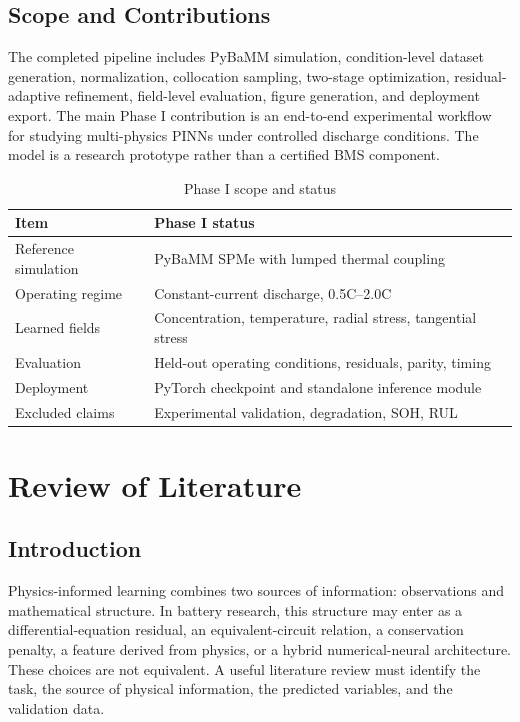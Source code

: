 \documentclass[14pt,a4paper,oneside]{extreport}
\begin{document}
\section{Scope and Contributions}
\label{sec:intro-last}
The completed pipeline includes PyBaMM simulation, condition-level dataset generation, normalization, collocation sampling, two-stage optimization, residual-adaptive refinement, field-level evaluation, figure generation, and deployment export. The main Phase I contribution is an end-to-end experimental workflow for studying multi-physics PINNs under controlled discharge conditions. The model is a research prototype rather than a certified BMS component.

\begin{table}[htbp]
\centering
\caption{Phase I scope and status}
\small
\begin{tabularx}{\textwidth}{p{}X}
\toprule
Item & Phase I status\\
\midrule
Reference simulation & PyBaMM SPMe with lumped thermal coupling\\
Operating regime & Constant-current discharge, 0.5C--2.0C\\
Learned fields & Concentration, temperature, radial stress, tangential stress\\
Evaluation & Held-out operating conditions, residuals, parity, timing\\
Deployment & PyTorch checkpoint and standalone inference module\\
Excluded claims & Experimental validation, degradation, SOH, RUL\\
\bottomrule
\end{tabularx}
\end{table}

\chapter{Review of Literature}
\label{chap:literature}
\section{Introduction}
\label{sec:lit-first}
Physics-informed learning combines two sources of information: observations and mathematical structure. In battery research, this structure may enter as a differential-equation residual, an equivalent-circuit relation, a conservation penalty, a feature derived from physics, or a hybrid numerical-neural architecture. These choices are not equivalent. A useful literature review must identify the task, the source of physical information, the predicted variables, and the validation data.
\end{document}
